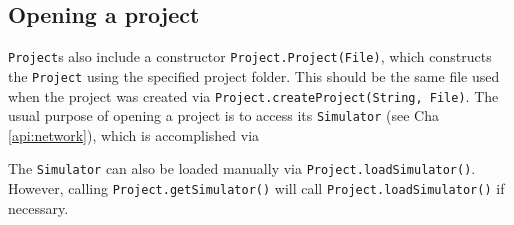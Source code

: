 \subsection{Opening a project}

\texttt{Project}s also include a constructor \texttt{Project.Project(File)}, which constructs the \texttt{Project} using the specified project folder. This should be the same file used when the project was created via \texttt{Project.createProject(String, File)}. The usual purpose of opening a project is to access its \texttt{Simulator} (see Cha \ref{api:network}), which is accomplished via
\begin{algorithmic}[1]
\end{algorithmic}
The \texttt{Simulator} can also be loaded manually via \texttt{Project.loadSimulator()}. However, calling \texttt{Project.getSimulator()} will call \texttt{Project.loadSimulator()} if necessary.